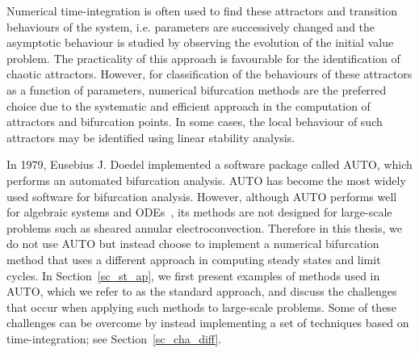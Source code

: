 Numerical time-integration is often used to find these attractors and transition behaviours of the system, i.e. parameters are successively changed and the asymptotic behaviour is studied by observing the evolution of the initial value problem. The practicality of this approach is favourable for the identification of chaotic attractors. However, for classification of the behaviours of these attractors as a function of parameters, numerical bifurcation methods are the preferred choice due to the systematic and efficient approach in the computation of attractors and bifurcation points.
In some cases, the local behaviour of such attractors may be identified using linear stability analysis.

In 1979, Eusebius J. Doedel implemented a software package called AUTO, which performs an automated bifurcation analysis. AUTO has become the most widely used software for bifurcation analysis. However, although AUTO performs well for algebraic systems and ODEs~\cite{Doedel_auto2000}, its methods are not designed for large-scale problems such as sheared annular electroconvection. Therefore in this thesis, we do not use AUTO but instead choose to implement a numerical bifurcation method that uses a different approach in computing steady states and limit cycles. %
In Section~\ref{sc_st_ap}, we first present examples of methods used in AUTO, which we refer to as the standard approach, and discuss the challenges that occur when applying such methods to large-scale problems. Some of these challenges can be overcome by instead implementing a set of techniques based on time-integration; see Section~\ref{sc_cha_diff}.

